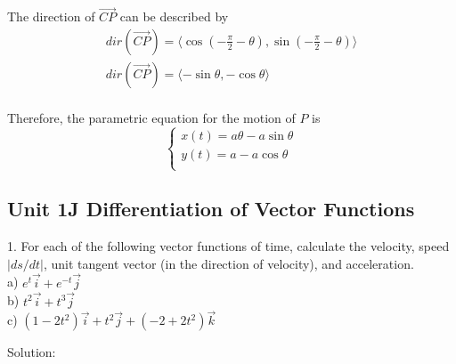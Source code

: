 \documentclass{article}
\begin{document}
The direction of $\vec{CP}$ can be described by
\begin{gather*}
  dir(\vec{CP}) = \langle \cos(-\frac{\pi}{2} - \theta), \sin(-\frac{\pi}{2} - \theta) \rangle \\
  dir(\vec{CP}) = \langle -\sin\theta, -\cos\theta \rangle \\
\end{gather*}

Therefore, the parametric equation for the motion of $P$ is
\begin{equation*}
  \begin{cases}
    x(t) = a \theta - a \sin\theta \\
    y(t) = a - a \cos\theta \\
  \end{cases}
\end{equation*}

\subsection*{Unit 1J Differentiation of Vector Functions}

\bigskip

1. For each of the following vector functions of time, calculate the velocity, 
speed $|ds/dt|$, unit tangent vector (in the direction of velocity), and 
acceleration. \\
a) $e^t \vec{i} + e^{-t} \vec{j}$ \\
b) $t^2 \vec{i} + t^3 \vec{j}$ \\
c) $(1 - 2t^2) \vec{i} + t^2 \vec{j} + (-2 + 2t^2) \vec{k}$

Solution:
\end{document}
